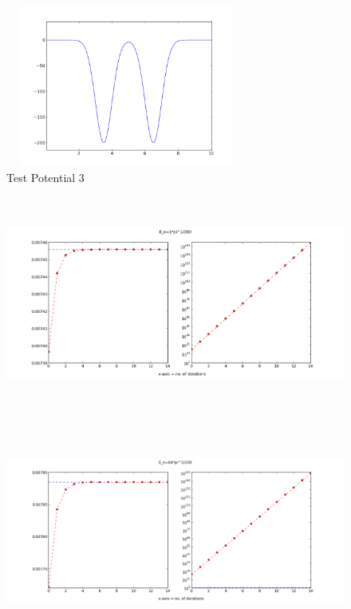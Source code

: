 \documentclass[a4paper,10pt]{report}
\begin{document}
\begin{figure}[hb]
\centering
\includegraphics[width=225pt, height=150pt]{potential1d2.png}
\caption[\textwidth]{Test Potential 3}
\end{figure}

\begin{center}
\begin{figure}[lht]
\includegraphics[width=360pt, height=200pt]{series3a.png}
\end{figure}
\end{center}

\begin{center}
\begin{figure}[lht]
\includegraphics[width=360pt, height=200pt]{series3b.png}
\end{figure}
\end{center}
\end{document}
